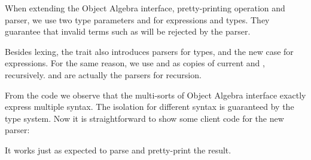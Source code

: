 When extending the Object Algebra interface, pretty-printing operation and parser, we use two type parameters  and  for expressions and types. They guarantee that invalid terms such as  will be rejected by the parser.

Besides lexing, the trait  also introduces parsers for types, and the new case for expressions. For the same reason,
we use  and  as copies of current  and , recursively.  and  are actually the parsers for recursion.

From the code we observe that the multi-sorts of Object Algebra interface
exactly express multiple syntax. The isolation for different syntax
is guaranteed by the type system. Now it is straightforward to show some client code
for the new parser:

It works just as expected to parse and pretty-print the result.
